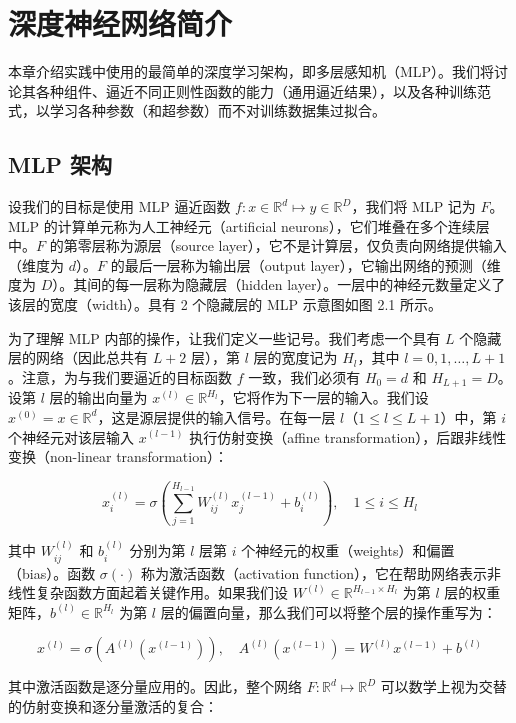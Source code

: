\chapter{深度神经网络简介}

本章介绍实践中使用的最简单的深度学习架构，即多层感知机（MLP）。我们将讨论其各种组件、逼近不同正则性函数的能力（通用逼近结果），以及各种训练范式，以学习各种参数（和超参数）而不对训练数据集过拟合。

\section{MLP 架构}

设我们的目标是使用 MLP 逼近函数 $f: x \in \mathbb{R}^d \mapsto y \in \mathbb{R}^D$，我们将 MLP 记为 $F$。MLP 的计算单元称为人工神经元（artificial neurons），它们堆叠在多个连续层中。$F$ 的第零层称为源层（source layer），它不是计算层，仅负责向网络提供输入（维度为 $d$）。$F$ 的最后一层称为输出层（output layer），它输出网络的预测（维度为 $D$）。其间的每一层称为隐藏层（hidden layer）。一层中的神经元数量定义了该层的宽度（width）。具有 2 个隐藏层的 MLP 示意图如图 2.1 所示。

为了理解 MLP 内部的操作，让我们定义一些记号。我们考虑一个具有 $L$ 个隐藏层的网络（因此总共有 $L+2$ 层），第 $l$ 层的宽度记为 $H_l$，其中 $l = 0,1,\dots,L+1$。注意，为与我们要逼近的目标函数 $f$ 一致，我们必须有 $H_0 = d$ 和 $H_{L+1} = D$。设第 $l$ 层的输出向量为 $x^{(l)} \in \mathbb{R}^{H_l}$，它将作为下一层的输入。我们设 $x^{(0)} = x \in \mathbb{R}^d$，这是源层提供的输入信号。在每一层 $l$（$1 \leq l \leq L+1$）中，第 $i$ 个神经元对该层输入 $x^{(l-1)}$ 执行仿射变换（affine transformation），后跟非线性变换（non-linear transformation）：

\[
x^{(l)}_i = \sigma \left( \sum_{j=1}^{H_{l-1}} W^{(l)}_{ij} x^{(l-1)}_j + b^{(l)}_i \right), \quad 1 \leq i \leq H_l
\]

其中 $W^{(l)}_{ij}$ 和 $b^{(l)}_i$ 分别为第 $l$ 层第 $i$ 个神经元的权重（weights）和偏置（bias）。函数 $\sigma(\cdot)$ 称为激活函数（activation function），它在帮助网络表示非线性复杂函数方面起着关键作用。如果我们设 $W^{(l)} \in \mathbb{R}^{H_{l-1} \times H_l}$ 为第 $l$ 层的权重矩阵，$b^{(l)} \in \mathbb{R}^{H_l}$ 为第 $l$ 层的偏置向量，那么我们可以将整个层的操作重写为：

\[
x^{(l)} = \sigma \left( A^{(l)}(x^{(l-1)}) \right), \quad A^{(l)}(x^{(l-1)}) = W^{(l)} x^{(l-1)} + b^{(l)}
\]

其中激活函数是逐分量应用的。因此，整个网络 $F: \mathbb{R}^d \mapsto \mathbb{R}^D$ 可以数学上视为交替的仿射变换和逐分量激活的复合：

